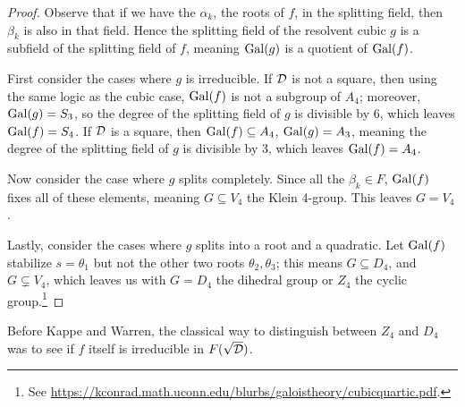 \begin{proof}
    Observe that if we have the \(\alpha_k\), the roots of \(f\), in the splitting field,
    then \(\beta_k\) is also in that field.
    Hence the splitting field of the resolvent cubic \(g\) is a subfield of the splitting field of \(f\),
    meaning \(\operatorname{Gal}(g)\) is a quotient of \(\operatorname{Gal}(f)\).

    First consider the cases where \(g\) is irreducible.
    If \(\mathcal{D}\) is not a square, then using the same logic as the cubic case,
    \(\operatorname{Gal}(f)\) is not a subgroup of \(A_4\);
    moreover, \(\operatorname{Gal}(g) = S_3\), so the degree of the splitting field of \(g\) is divisible by 6,
    which leaves \(\operatorname{Gal}(f) = S_4\).
    If \(\mathcal{D}\) is a square, then \(\operatorname{Gal}(f) \subseteq A_4\), \(\operatorname{Gal}(g) = A_3\),
    meaning the degree of the splitting field of \(g\) is divisible by 3,
    which leaves \(\operatorname{Gal}(f) = A_4\).

    Now consider the case where \(g\) splits completely.
    Since all the \(\beta_k \in F\), \(\operatorname{Gal}(f)\) fixes all of these elements,
    meaning \(G \subseteq V_4\) the Klein 4-group.
    This leaves \(G = V_4\).

    Lastly, consider the cases where \(g\) splits into a root and a quadratic.
    Let \(\operatorname{Gal}(f)\) stabilize \(s = \theta_1\) but not the other two roots \(\theta_2,\theta_3\);
    this means \(G \subseteq D_4\), and \(G \subsetneq V_4\),
    which leaves us with \(G = D_4\) the dihedral group or \(Z_4\) the cyclic group.\footnote{%
        See \url{https://kconrad.math.uconn.edu/blurbs/galoistheory/cubicquartic.pdf}.
    }
\end{proof}
\begin{remark}
    Before Kappe and Warren, the classical way to distinguish between \(Z_4\) and \(D_4\)
    was to see if \(f\) itself is irreducible in \(F(\sqrt{\mathcal{D}})\).
\end{remark}

